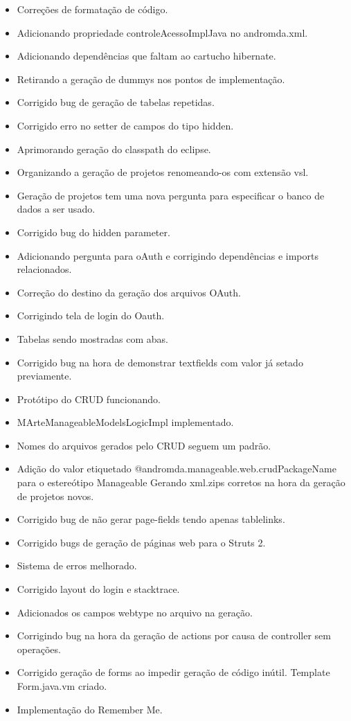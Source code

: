 \begin{itemize}
  \item Correções de formatação de código.
  \item Adicionando propriedade controleAcessoImplJava no andromda.xml.
  \item Adicionando dependências que faltam ao cartucho hibernate.
  \item Retirando a geração de dummys nos pontos de implementação.
  \item Corrigido bug de geração de tabelas repetidas.
  \item Corrigido erro no setter de campos do tipo hidden.
  \item Aprimorando geração do classpath do eclipse.
  \item Organizando a geração de projetos renomeando-os com extensão vsl.
  \item Geração de projetos tem uma nova pergunta para especificar o banco de
dados a ser usado.
  \item Corrigido bug do hidden parameter.
  \item Adicionando pergunta para oAuth e corrigindo dependências e imports
relacionados.
  \item Correção do destino da geração dos arquivos OAuth.
  \item Corrigindo tela de login do Oauth.
  \item Tabelas sendo mostradas com abas.
  \item Corrigido bug na hora de demonstrar textfields com valor já setado
previamente.
  \item Protótipo do CRUD funcionando.
  \item MArteManageableModelsLogicImpl implementado.
  \item Nomes do arquivos gerados pelo CRUD seguem um padrão.
  \item Adição do valor etiquetado @andromda.manageable.web.crudPackageName para
o estereótipo Manageable Gerando xml.zips corretos na hora da geração de projetos novos.
  \item Corrigido bug de não gerar page-fields tendo apenas tablelinks.
  \item Corrigido bugs de geração de páginas web para o Struts 2.
  \item Sistema de erros melhorado.
  \item Corrigido layout do login e stacktrace.
  \item Adicionados os campos webtype no arquivo na geração.
  \item Corrigindo bug na hora da geração de actions por causa de controller sem
operações.
  \item Corrigido geração de forms ao impedir geração de código inútil. Template
Form.java.vm criado.
  \item Implementação do Remember Me.
\end{itemize}

